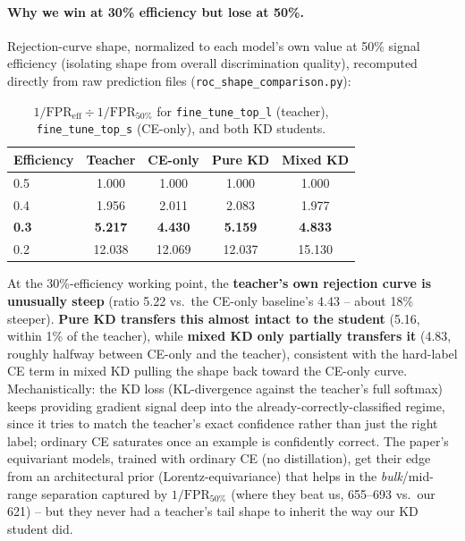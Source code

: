 \paragraph{Why we win at 30\% efficiency but lose at 50\%.} Rejection-curve
shape, normalized to each model's own value at 50\% signal efficiency
(isolating shape from overall discrimination quality), recomputed directly
from raw prediction files (\texttt{roc\_shape\_comparison.py}):

\begin{table}[h]
    \centering
    \small
    \begin{tabular}{lcccc}
        \toprule
        Efficiency & Teacher & CE-only & Pure KD & Mixed KD \\
        \midrule
        0.5 & 1.000 & 1.000 & 1.000 & 1.000 \\
        0.4 & 1.956 & 2.011 & 2.083 & 1.977 \\
        \textbf{0.3} & \textbf{5.217} & \textbf{4.430} & \textbf{5.159} & \textbf{4.833} \\
        0.2 & 12.038 & 12.069 & 12.037 & 15.130 \\
        \bottomrule
    \end{tabular}
    \caption{$1/\mathrm{FPR}_{\text{eff}} \div 1/\mathrm{FPR}_{50\%}$ for
    \texttt{fine\_tune\_top\_l} (teacher), \texttt{fine\_tune\_top\_s}
    (CE-only), and both KD students.}
    \label{tab:lgatr-roc-shape}
\end{table}

At the 30\%-efficiency working point, the \textbf{teacher's own rejection
curve is unusually steep} (ratio 5.22 vs.\ the CE-only baseline's 4.43 --
about 18\% steeper). \textbf{Pure KD transfers this almost intact to the
student} (5.16, within 1\% of the teacher), while \textbf{mixed KD only
partially transfers it} (4.83, roughly halfway between CE-only and the
teacher), consistent with the hard-label CE term in mixed KD pulling the
shape back toward the CE-only curve. Mechanistically: the KD loss
(KL-divergence against the teacher's full softmax) keeps providing gradient
signal deep into the already-correctly-classified regime, since it tries to
match the teacher's exact confidence rather than just the right label;
ordinary CE saturates once an example is confidently correct. The paper's
equivariant models, trained with ordinary CE (no distillation), get their
edge from an architectural prior (Lorentz-equivariance) that helps in the
\emph{bulk}/mid-range separation captured by $1/\mathrm{FPR}_{50\%}$ (where
they beat us, 655--693 vs.\ our 621) -- but they never had a teacher's tail
shape to inherit the way our KD student did.

